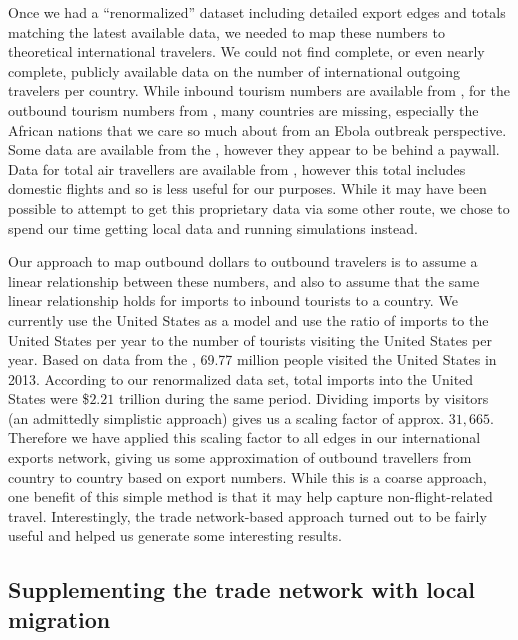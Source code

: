 \documentclass[10pt, journal,onecolumn]{IEEEtran}
\begin{document}
Once we had a ``renormalized'' dataset including detailed export edges and totals matching
the latest available data, we needed to map these numbers to theoretical international travelers.
We could not find complete, or even nearly complete, publicly available data on the number of
international outgoing travelers per country. While inbound tourism numbers are available from
\citep{worldbankinboundtourism}, for the outbound tourism numbers from \citep{worldbankoutboundtourism},
many countries are missing,
especially the African nations that we care so much about from an Ebola outbreak perspective.
Some data are available from the \citep{unwtooutboundtourism}, however they appear to be behind a paywall.
Data for total air travellers are available from \citep{worldbankairpassengers},
however this total includes domestic flights and so is less useful for our purposes.
While it may have been possible to attempt to get this proprietary data via some other route,
we chose to spend our time getting local data and running simulations instead.

Our approach to map outbound dollars to outbound travelers is to assume a linear relationship
between these numbers, and also to assume that the same linear relationship holds for imports to
inbound tourists to a country.
We currently use the United States as a model and use the ratio of
imports to the United States per year to the number of tourists visiting the United States per year.
Based on data from the \citep{usinboundtourists}, 69.77 million people visited the United States in 2013.
According to our renormalized data set, total imports into the United States were
\$$2.21$ trillion during the same period. Dividing imports by visitors (an admittedly
simplistic approach) gives us a scaling factor of approx. $31,665$. Therefore we have applied this
scaling factor to all edges in our international exports network, giving us some approximation of
outbound travellers from country to country based on export numbers.
While this is a coarse approach, one benefit of this simple method is that it may help capture non-flight-related
travel. Interestingly, the trade network-based approach turned out to be fairly useful and helped us generate
some interesting results.

\subsection{{Supplementing the trade network with local migration}}
\label{SubSec:LocalData}
\end{document}
